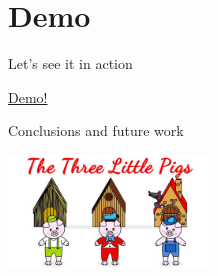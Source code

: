 \documentclass[9pt]{beamer}
\begin{document}
\section{Demo}
\begin{frame}{Let's see it in action}

\begin{center}
	\Huge{\href{http://localhost:8888}{Demo!}}
\end{center}

\end{frame}




\begin{frame}{Conclusions and future work}
	\begin{center}
		\includegraphics[width=0.4\textwidth,height=!,trim={29cm 0 0 5.2cm},clip]{imgs/houses.jpg}
	\end{center}
\end{frame}
\end{document}
